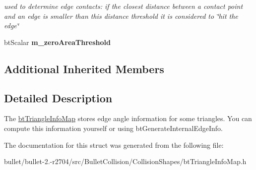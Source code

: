 \begin{DoxyCompactItemize}
\begin{DoxyCompactList}\small\item\em used to determine edge contacts\+: if the closest distance between a contact point and an edge is smaller than this distance threshold it is considered to \char`\"{}hit the edge\char`\"{} \end{DoxyCompactList}\item 
\hypertarget{structbt_triangle_info_map_a5a218d3c04023fb08543f2cf8b50cd76}{bt\+Scalar {\bfseries m\+\_\+zero\+Area\+Threshold}}\label{structbt_triangle_info_map_a5a218d3c04023fb08543f2cf8b50cd76}

\end{DoxyCompactItemize}
\subsection*{Additional Inherited Members}


\subsection{Detailed Description}
The \hyperlink{structbt_triangle_info_map}{bt\+Triangle\+Info\+Map} stores edge angle information for some triangles. You can compute this information yourself or using bt\+Generate\+Internal\+Edge\+Info. 

The documentation for this struct was generated from the following file\+:\begin{DoxyCompactItemize}
\item 
bullet/bullet-\/2.-\/r2704/src/\+Bullet\+Collision/\+Collision\+Shapes/bt\+Triangle\+Info\+Map.\+h\end{DoxyCompactItemize}
